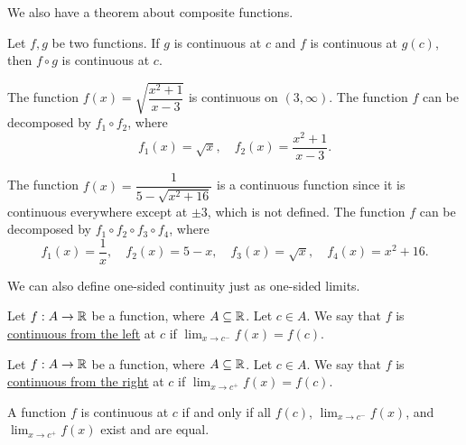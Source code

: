 \documentclass[11pt]{book}
\begin{document}
We also have a theorem about composite functions.

\begin{theorem}
    Let $f, g$ be two functions. If $g$ is continuous at $c$ and $f$ is continuous at $g(c)$, then $f\circ g$ is continuous at $c$.
\end{theorem}

\begin{example} 
    The function $f(x)=\sqrt{\dfrac{x^2+1}{x-3}}$ is continuous on $(3, \infty)$. The function $f$ can be decomposed by $f_1\circ f_2$, where \begin{equation*}
        f_1(x)=\sqrt{x},\quad f_2(x)=\dfrac{x^2+1}{x-3}.
    \end{equation*}
\end{example}

\begin{example} 
    The function $f(x)=\dfrac{1}{5-\sqrt{x^2+16}}$ is a continuous function since it is continuous everywhere except at $\pm3$, which is not defined. The function $f$ can be decomposed by $f_1\circ f_2\circ f_3\circ f_4$, where \begin{equation*}
        f_1(x)=\dfrac{1}{x}, \quad f_2(x)=5-x, \quad f_3(x)=\sqrt{x}, \quad f_4(x)=x^2+16.
    \end{equation*}
\end{example}

We can also define one-sided continuity just as one-sided limits.

\begin{definition}
    Let $f:A\to\mathbb{R}$ be a function, where $A\subseteq\mathbb{R}$. Let $c\in A$. We say that $f$ is \underline{continuous from the left} at $c$ if $\displaystyle\lim_{x\to c^-}f(x)=f(c)$.
\end{definition}

\begin{definition}
    Let $f:A\to\mathbb{R}$ be a function, where $A\subseteq\mathbb{R}$. Let $c\in A$. We say that $f$ is \underline{continuous from the right} at $c$ if $\displaystyle\lim_{x\to c^+}f(x)=f(c)$.
\end{definition}

\begin{theorem}
    A function $f$ is continuous at $c$ if and only if all $f(c)$, $\displaystyle\lim_{x\to c^-}f(x)$, and $\displaystyle\lim_{x\to c^+}f(x)$ exist and are equal.
\end{theorem}
\end{document}
